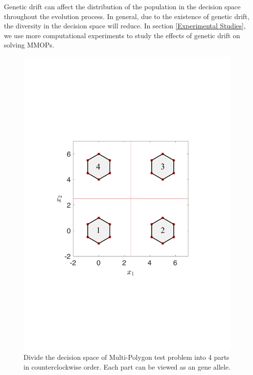 \documentclass[conference]{IEEEtran}
\begin{document}
Genetic drift can affect the distribution of the population in the decision space throughout the evolution process. In general, due to the existence of genetic drift, the diversity in the decision space will reduce. In section \ref{Experimental Studies}, we use more computational experiments to study the effects of genetic drift on solving MMOPs.

\begin{figure}[htbp]
    \centering
    \includegraphics[width=.3\textwidth]{Section3/Alleles}
    \caption{Divide the decision space of Multi-Polygon test problem into 4 parts in counterclockwise order. Each part can be viewed as an gene allele.}
    \label{fig: Alleles}
\end{figure}
\end{document}
